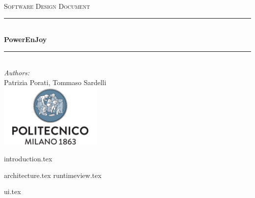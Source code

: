 \documentclass[a4paper,11pt]{article}
\begin{document}
\begin{titlepage}
\begin{center}
\textsc{\LARGE Software Design Document}\\[1.5cm] %

\rule{\linewidth}{0.5mm} \\[0.7cm]
{\huge \bfseries PowerEnJoy}\\[0.4cm] %
\rule{\linewidth}{0.5mm} \\[1.5cm]

\emph{Authors:}\\
Patrizia Porati, Tommaso Sardelli\\[2.0cm]

\vfill
\vfill
\includegraphics[width=50mm]{polimi.png}\\
\end{center}
\end{titlepage}

\tableofcontents
\pagebreak

{introduction.tex}

{architecture.tex}
{runtimeview.tex}


{ui.tex}



\end{document}

